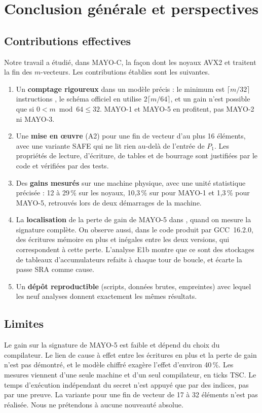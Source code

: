 \let\textcircled=\pgftextcircled
\chapter*{Conclusion générale et perspectives}
\label{chap:conclusion}

\section*{Contributions effectives}
Notre travail a étudié, dans MAYO-C, la façon dont les noyaux AVX2  et  traitent la fin des $m$-vecteurs. Les contributions établies sont les suivantes.
\begin{enumerate}
\item Un \textbf{comptage rigoureux} dans un modèle précis : le minimum est $\lceil m/32\rceil$ instructions \vpshufb{}, le schéma officiel en utilise $2\lceil m/64\rceil$, et un gain n'est possible que si $0<m\bmod64\le32$. MAYO-1 et MAYO-5 en profitent, pas MAYO-2 ni MAYO-3.
\item Une \textbf{mise en œuvre} (A2) pour une fin de vecteur d'au plus 16 éléments, avec une variante SAFE qui ne lit rien au-delà de l'entrée de $P_1$. Les propriétés de lecture, d'écriture, de tables et de bourrage sont justifiées par le code et vérifiées par des tests.
\item Des \textbf{gains mesurés} sur une machine physique, avec une unité statistique précisée : 12 à 29\,\% sur les noyaux, 10,3\,\% sur  pour MAYO-1 et 1,3\,\% pour MAYO-5, retrouvés lors de deux démarrages de la machine.
\item La \textbf{localisation} de la perte de gain de MAYO-5 dans , quand on mesure la signature complète. On observe aussi, dans le code produit par GCC~16.2.0, des écritures mémoire en plus et inégales entre les deux versions, qui correspondent à cette perte. L'analyse E1b montre que ce sont des stockages de tableaux d'accumulateurs refaits à chaque tour de boucle, et écarte la passe SRA comme cause.
\item Un \textbf{dépôt reproductible} (scripts, données brutes, empreintes) avec lequel les neuf analyses donnent exactement les mêmes résultats.
\end{enumerate}

\section*{Limites}
Le gain sur la signature de MAYO-5 est faible et dépend du choix du compilateur. Le lien de cause à effet entre les écritures en plus et la perte de gain n'est pas démontré, et le modèle chiffré exagère l'effet d'environ 40\,\%. Les mesures viennent d'une seule machine et d'un seul compilateur, en ticks TSC. Le temps d'exécution indépendant du secret n'est appuyé que par des indices, pas par une preuve. La variante pour une fin de vecteur de 17 à 32 éléments n'est pas réalisée. Nous ne prétendons à aucune nouveauté absolue.

